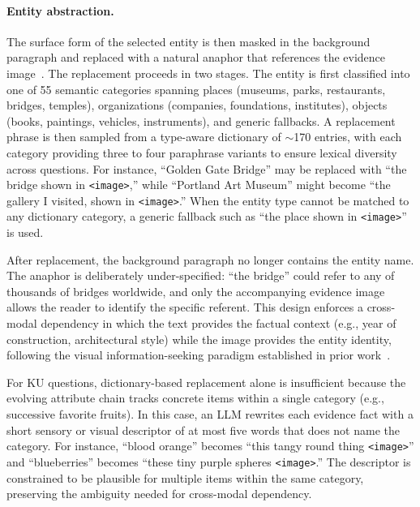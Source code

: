 \documentclass{llmxive}
\begin{document}
\paragraph{Entity abstraction.}
The surface form of the selected entity is then masked in the background paragraph and replaced with a natural anaphor that references the evidence image~\cite{viquae,mragbench,chen2023pretrainedvisionlanguagemodels}. The replacement proceeds in two stages. The entity is first classified into one of 55 semantic categories spanning places (museums, parks, restaurants, bridges, temples), organizations (companies, foundations, institutes), objects (books, paintings, vehicles, instruments), and generic fallbacks. A replacement phrase is then sampled from a type-aware dictionary of $\sim$170 entries, with each category providing three to four paraphrase variants to ensure lexical diversity across questions. For instance, ``Golden Gate Bridge'' may be replaced with ``the bridge shown in \texttt{<image>},'' while ``Portland Art Museum'' might become ``the gallery I visited, shown in \texttt{<image>}.'' When the entity type cannot be matched to any dictionary category, a generic fallback such as ``the place shown in \texttt{<image>}'' is used.

After replacement, the background paragraph no longer contains the entity name. The anaphor is deliberately under-specified: ``the bridge'' could refer to any of thousands of bridges worldwide, and only the accompanying evidence image allows the reader to identify the specific referent. This design enforces a cross-modal dependency in which the text provides the factual context (e.g., year of construction, architectural style) while the image provides the entity identity, following the visual information-seeking paradigm established in prior work~\cite{chen2023pretrainedvisionlanguagemodels,viquae}.

For KU questions, dictionary-based replacement alone is insufficient because the evolving attribute chain tracks concrete items within a single category (e.g., successive favorite fruits). In this case, an LLM rewrites each evidence fact with a short sensory or visual descriptor of at most five words that does not name the category. For instance, ``blood orange'' becomes ``this tangy round thing \texttt{<image>}'' and ``blueberries'' becomes ``these tiny purple spheres \texttt{<image>}.'' The descriptor is constrained to be plausible for multiple items within the same category, preserving the ambiguity needed for cross-modal dependency.
\end{document}
